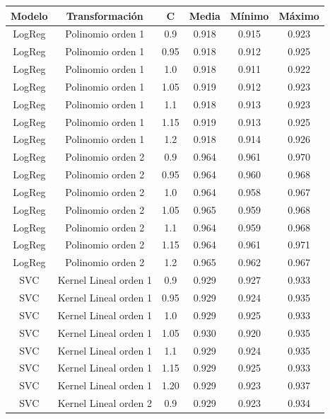 \documentclass[11pt]{article}
\begin{document}
\begin{table}
\centering
\begin{tabular}{|c|c|c|c|c|c|}
    \hline
    \textbf{Modelo} & \textbf{Transformación} & \textbf{C} & \textbf{Media} & \textbf{Mínimo} & \textbf{Máximo} \\
    \hline
    LogReg & Polinomio orden 1 & 0.9 & 0.918 & 0.915 & 0.923 \\
    LogReg & Polinomio orden 1 & 0.95 & 0.918 & 0.912 & 0.925 \\
    LogReg & Polinomio orden 1 & 1.0 & 0.918 & 0.911 & 0.922 \\
    LogReg & Polinomio orden 1 & 1.05 & 0.919 & 0.912 & 0.923 \\
    LogReg & Polinomio orden 1 & 1.1 & 0.918 & 0.913 & 0.923 \\
    LogReg & Polinomio orden 1 & 1.15 & 0.919 & 0.913 & 0.925 \\
    LogReg & Polinomio orden 1 & 1.2 & 0.918 & 0.914 & 0.926 \\
    LogReg & Polinomio orden 2 & 0.9 & 0.964 & 0.961 & 0.970 \\
    LogReg & Polinomio orden 2 & 0.95 & 0.964 & 0.960 & 0.968 \\
    LogReg & Polinomio orden 2 & 1.0 & 0.964 & 0.958 & 0.967 \\
    LogReg & Polinomio orden 2 & 1.05 & 0.965 & 0.959 & 0.968 \\
    LogReg & Polinomio orden 2 & 1.1 & 0.964 & 0.959 & 0.968 \\
    LogReg & Polinomio orden 2 & 1.15 & 0.964 & 0.961 & 0.971 \\
    LogReg & Polinomio orden 2 & 1.2 & 0.965 & 0.962 & 0.967 \\
    SVC & Kernel Lineal orden 1 & 0.9 & 0.929 & 0.927 & 0.933 \\
    SVC & Kernel Lineal orden 1 & 0.95 & 0.929 & 0.924 & 0.935 \\
    SVC & Kernel Lineal orden 1 & 1.0 & 0.929 & 0.925 & 0.933 \\
    SVC & Kernel Lineal orden 1 & 1.05 & 0.930 & 0.920 & 0.935 \\
    SVC & Kernel Lineal orden 1 & 1.1 & 0.929 & 0.924 & 0.935 \\
    SVC & Kernel Lineal orden 1 & 1.15 & 0.929 & 0.925 & 0.933 \\
    SVC & Kernel Lineal orden 1 & 1.20 & 0.929 & 0.923 & 0.937 \\
    SVC & Kernel Lineal orden 2 & 0.9 & 0.929 & 0.923 & 0.934 \\

\end{tabular}
\end{table}
\end{document}

